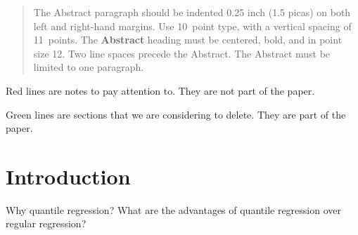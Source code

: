 \documentclass[twoside]{article} \usepackage{aistats2017}
\theoremstyle{definition}
\theoremstyle{remark}
\newcommand{\warn}[1]{{\color{RedOrange} #1}}
\newcommand{\extra}[1]{{\color{ForestGreen} #1}}
\begin{document}
%

%


\begin{abstract}
  The Abstract paragraph should be indented 0.25 inch (1.5 picas) on
  both left and right-hand margins. Use 10~point type, with a vertical
  spacing of 11~points. The {\bf Abstract} heading must be centered,
  bold, and in point size 12. Two line spaces precede the
  Abstract. The Abstract must be limited to one paragraph.
\end{abstract}





\warn{Red lines are notes to pay attention to. They are not part of the paper.}

\extra{Green lines are sections that we are considering to delete. They are part of the paper.}

\section{Introduction}
\label{sec:introduction}
	
	\warn{Why quantile regression? What are the advantages of quantile regression over regular regression?}
	
\end{document}
